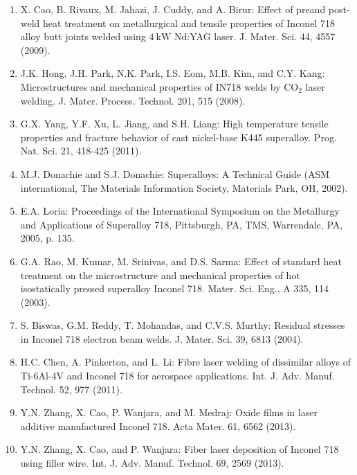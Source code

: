 \documentclass[10pt]{article}
\begin{document}
\begin{enumerate}
  \item X. Cao, B. Rivaux, M. Jahazi, J. Cuddy, and A. Birur: Effect of preand post-weld heat treatment on metallurgical and tensile properties of Inconel 718 alloy butt joints welded using $4 \mathrm{~kW}$ Nd:YAG laser. J. Mater. Sci. 44, 4557 (2009).

  \item J.K. Hong, J.H. Park, N.K. Park, I.S. Eom, M.B. Kim, and C.Y. Kang: Microstructures and mechanical properties of IN718 welds by $\mathrm{CO}_{2}$ laser welding. J. Mater. Process. Technol. 201, 515 (2008).

  \item G.X. Yang, Y.F. Xu, L. Jiang, and S.H. Liang: High temperature tensile properties and fracture behavior of cast nickel-base K445 superalloy. Prog. Nat. Sci. 21, 418-425 (2011).

  \item M.J. Donachie and S.J. Donachie: Superalloys: A Technical Guide (ASM international, The Materials Information Society, Materials Park, OH, 2002).

  \item E.A. Loria: Proceedings of the International Symposium on the Metallurgy and Applications of Superalloy 718, Pittsburgh, PA, TMS, Warrendale, PA, 2005, p. 135.

  \item G.A. Rao, M. Kumar, M. Srinivas, and D.S. Sarma: Effect of standard heat treatment on the microstructure and mechanical properties of hot isostatically pressed superalloy Inconel 718. Mater. Sci. Eng., A 335, 114 (2003).

  \item S. Biswas, G.M. Reddy, T. Mohandas, and C.V.S. Murthy: Residual stresses in Inconel 718 electron beam welds. J. Mater. Sci. 39, 6813 (2004).

  \item H.C. Chen, A. Pinkerton, and L. Li: Fibre laser welding of dissimilar alloys of Ti-6Al-4V and Inconel 718 for aerospace applications. Int. J. Adv. Manuf. Technol. 52, 977 (2011).

  \item Y.N. Zhang, X. Cao, P. Wanjara, and M. Medraj: Oxide films in laser additive manufactured Inconel 718. Acta Mater. 61, 6562 (2013).

  \item Y.N. Zhang, X. Cao, and P. Wanjara: Fiber laser deposition of Inconel 718 using filler wire. Int. J. Adv. Manuf. Technol. 69, 2569 (2013).


\end{enumerate}
\end{document}

